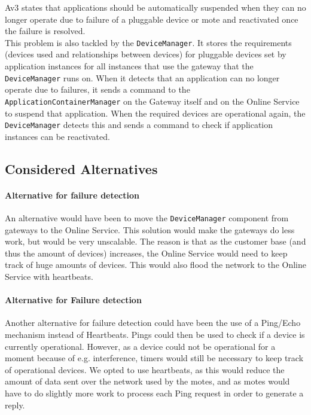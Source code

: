         Av3 states that applications should be automatically suspended when they can no longer
        operate due to failure of a pluggable device or mote and reactivated
        once the failure is resolved. \\
        This problem is also tackled by the \texttt{DeviceManager}. It
        stores the requirements (devices used and relationships between devices)
        for pluggable devices set by application instances for all
        instances that use the gateway that the \texttt{DeviceManager}
        runs on. When it detects that an application can no longer operate
        due to failures, it sends a command to the \texttt{ApplicationContainerManager}
        on the Gateway itself and on the Online Service
        to suspend that application. When the required devices are operational
        again, the \texttt{DeviceManager} detects this and sends a
        command to check if application instances can be reactivated. 

    \subsection*{Considered Alternatives}
        \paragraph{Alternative for failure detection}
            An alternative would have been to move the \texttt{DeviceManager}
            component from gateways to the Online Service. This solution would make the
            gateways do less work, but would be very unscalable. The reason is
            that as the customer base (and thus the amount of devices) increases,
            the Online Service would need to keep track of huge amounts of devices.
            This would also flood the network to the Online Service with heartbeats.

        \paragraph{Alternative for Failure detection}
            Another alternative for failure detection could have been the use of
            a Ping/Echo mechanism instead of Heartbeats. Pings could then be used
            to check if a device is currently operational. However, as a device could
            not be operational for a moment because of e.g. interference, timers
            would still be necessary to keep track of operational devices. We opted
            to use heartbeats, as this would reduce the amount of data sent over
            the network used by the motes, and as motes would have to do slightly
            more work to process each Ping request in order to generate a reply.

